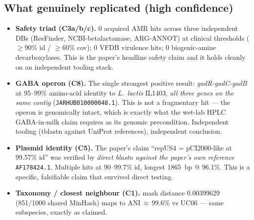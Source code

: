 \documentclass[11pt,a4paper]{article}
\begin{document}
\subsection{What genuinely replicated (high confidence)}
\begin{itemize}
    \item \textbf{Safety triad (C3a/b/c).} 0 acquired AMR hits across three independent DBs (ResFinder, NCBI-betalactamase, ARG-ANNOT) at clinical thresholds ($\geq$90\% id / $\geq$60\% cov); 0 VFDB virulence hits; 0 biogenic-amine decarboxylases. This is the paper's headline safety claim and it holds cleanly on an independent tooling stack.
    \item \textbf{GABA operon (C8).} The single strongest positive result: \emph{gadR-gadC-gadB} at 95--99\% amino-acid identity to \textit{L.\ lactis} IL1403, \emph{all three genes on the same contig} (\texttt{JARHUB010000048.1}). This is not a fragmentary hit --- the operon is genomically intact, which is exactly what the wet-lab HPLC GABA-in-milk claim requires as its genomic precondition. Independent tooling (tblastn against UniProt references), independent conclusion.
    \item \textbf{Plasmid identity (C5).} The paper's claim ``repUS4 = pCI2000-like at 99.57\% id'' was verified by \emph{direct blastn against the paper's own reference} \texttt{AF178424.1}. Multiple hits at 90--99.7\% id, longest 1865~bp @ 96.1\%. This is a specific, falsifiable claim that survived direct testing.
    \item \textbf{Taxonomy / closest neighbour (C1).} mash distance 0.00399629 (851/1000 shared MinHash) maps to ANI\,$\approx$\,99.6\% vs UC06 --- same subspecies, exactly as claimed.
\end{itemize}
\end{document}
